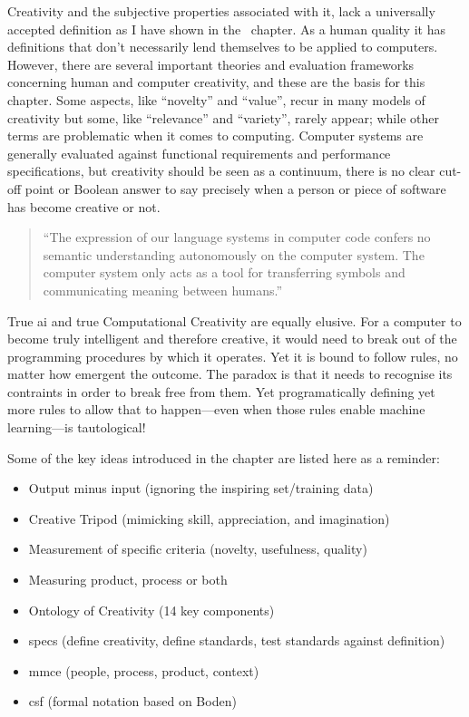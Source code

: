 Creativity and the subjective properties associated with it, lack a universally accepted definition as I have shown in the~ chapter. As a human quality it has definitions that don’t necessarily lend themselves to be applied to computers. However, there are several important theories and evaluation frameworks concerning human and computer creativity, and these are the basis for this chapter. Some aspects, like ``novelty'' and ``value'', recur in many models of creativity but some, like ``relevance'' and ``variety'', rarely appear; while other terms are problematic when it comes to computing. Computer systems are generally evaluated against functional requirements and performance specifications, but creativity should be seen as a continuum, there is no clear cut-off point or Boolean answer to say precisely when a person or piece of software has become creative or not.

\begin{quotation}
  ``The expression of our language systems in computer code confers no semantic understanding autonomously on the computer system. The computer system only acts as a tool for transferring symbols and communicating meaning between humans.'' 
\end{quotation}

True \gls{ai} and true Computational Creativity are equally elusive. For a computer to become truly intelligent and therefore creative, it would need to break out of the programming procedures by which it operates. Yet it is bound to follow rules, no matter how emergent the outcome. The paradox is that it needs to recognise its contraints in order to break free from them. Yet programatically defining yet more rules to allow that to happen---even when those rules enable machine learning---is tautological!

\spirals

Some of the key ideas introduced in the  chapter are listed here as a reminder:

\begin{itemize}
  \item Output minus input (ignoring the inspiring set/training data)
  \item Creative Tripod (mimicking skill, appreciation, and imagination)
  \item Measurement of specific criteria (novelty, usefulness, quality)
  \item Measuring product, process or both
  \item Ontology of Creativity (14 key components)
  \item \gls{specs} (define creativity, define standards, test standards against definition)
  \item \gls{mmce} (people, process, product, context)
  \item \gls{csf} (formal notation based on Boden)
\end{itemize}


